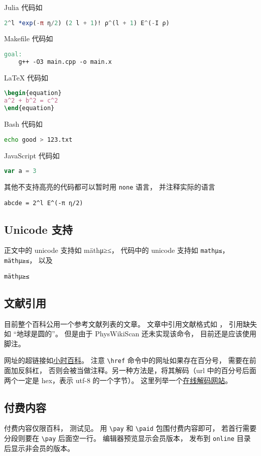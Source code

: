 Julia 代码如
\begin{lstlisting}[language=julia]
2^l *exp(-π η/2) (2 l + 1)! ρ^(l + 1) E^(-I ρ)
\end{lstlisting}

Makefile 代码如
\begin{lstlisting}[language=Makefile]
goal:
    g++ -O3 main.cpp -o main.x
\end{lstlisting}

LaTeX 代码如
\begin{lstlisting}[language=latex]
\begin{equation}
a^2 + b^2 = c^2
\end{equation}
\end{lstlisting}

Bash 代码如
\begin{lstlisting}[language=bash]
echo good > 123.txt
\end{lstlisting}

JavaScript 代码如
\begin{lstlisting}[language=js]
var a = 3
\end{lstlisting}

其他不支持高亮的代码都可以暂时用 \verb|none| 语言， 并注释实际的语言
\begin{lstlisting}[language=none]
abcde = 2^l E^(-π η/2)
\end{lstlisting}

\subsection{Unicode 支持}
正文中的 unicode 支持如 mäthμ≥≤， 代码中的 unicode 支持如 \verb|mathμ≤|， \lstinline|mäthμ≥≤|， 以及
\begin{lstlisting}[language=none]
mäthμ≥≤
\end{lstlisting}


\subsection{文献引用}
目前整个百科公用一个参考文献列表的文章。 文章中引用文献格式如 \cite{GriffE}， 引用缺失如 “地球是圆的\needCite”。 但是由于 PhysWikiScan 还未实现该命令， 目前还是应该使用脚注。

网址的超链接如\href{https://wuli.wiki}{小时百科}。 注意 \verb|\href| 命令中的网址如果存在百分号， 需要在前面加反斜杠， 否则会被当做注释。另一种方法是，将其解码（url 中的百分号后面两个一定是 hex，表示 utf-8 的一个字节）。 这里列举一个\href{https://www.webatic.com/url-convertor}{在线解码网站}。

\subsection{付费内容}
付费内容仅限百科， 测试见。 用 \verb|\pay| 和 \verb|\paid| 包围付费内容即可， 若首行需要分段则要在 \verb|\pay| 后面空一行。 编辑器预览显示会员版本， 发布到 \verb|online| 目录后显示非会员的版本。

